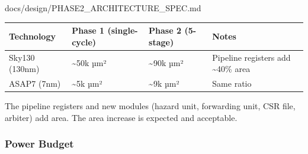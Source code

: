 \begin{relocated}{docs/design/PHASE2_ARCHITECTURE_SPEC.md}
{
\begin{longtable}[]{@{}
  >{\raggedright\arraybackslash}p{}
  >{\raggedright\arraybackslash}p{}
  >{\raggedright\arraybackslash}p{}
  >{\raggedright\arraybackslash}p{}@{}}
\toprule\noalign{}
\begin{minipage}[b]{\linewidth}\raggedright
Technology
\end{minipage} & \begin{minipage}[b]{\linewidth}\raggedright
Phase 1 (single-cycle)
\end{minipage} & \begin{minipage}[b]{\linewidth}\raggedright
Phase 2 (5-stage)
\end{minipage} & \begin{minipage}[b]{\linewidth}\raggedright
Notes
\end{minipage} \\
\midrule\noalign{}
\endhead
\bottomrule\noalign{}
\endlastfoot
Sky130 (130nm) & \textasciitilde50k µm² & \textasciitilde90k µm² &
Pipeline registers add \textasciitilde40\% area \\
ASAP7 (7nm) & \textasciitilde5k µm² & \textasciitilde9k µm² & Same
ratio \\
\end{longtable}
}

The pipeline registers and new modules (hazard unit, forwarding unit,
CSR file, arbiter) add area. The area increase is expected and
acceptable.

\subsubsection{Power Budget}\label{ds:ch:phase2-architecture:83-power-budget}


\end{relocated}

